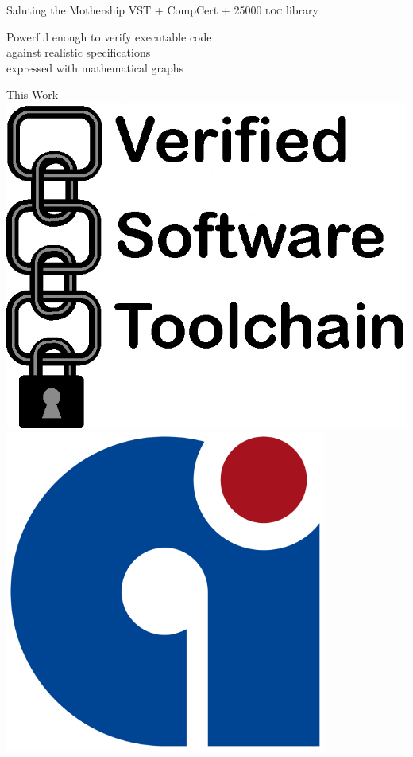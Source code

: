 \documentclass[usenames, xcolor=dvipsnames]{beamer}
\begin{document}
\begin{frame}{Saluting the Mothership}
\bigskip
VST + CompCert + 25000 \textsc{loc} library

\bigskip
Powerful enough to verify \alert{executable code}
\\\hspace{1em}against \alert{realistic specifications}
\\\hspace{2em}expressed with \alert{mathematical graphs}

\bigskip
{}
\end{frame}

\begin{frame}{This Work}
\includegraphics[scale=0.09]{vst_logo}
\hspace{2em} \includegraphics[scale=0.12]{compcert_logo}

\end{frame}
\end{document}
